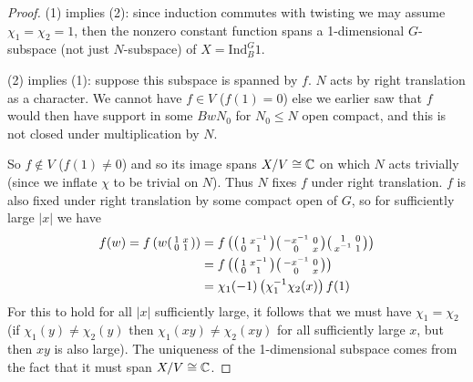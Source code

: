 \begin{proof}
    (1) implies (2): since induction commutes with twisting we may assume $\chi_1=\chi_2=1$, then the nonzero constant function spans a 1-dimensional $G$-subspace (not just $N$-subspace) of $X = \mathrm{Ind}_B^G 1$.

    (2) implies (1): suppose this subspace is spanned by $f$. $N$ acts by right translation as a character. We cannot have $f \in V$ ($f(1)=0$) else we earlier saw that $f$ would then have support in some $BwN_0$ for $N_0 \leq N$ open compact, and this is not closed under multiplication by $N$.

    So $f \not\in V$ ($f(1) \neq 0$) and so its image spans $X/V \cong \mathbb{C}$ on which $N$ acts trivially (since we inflate $\chi$ to be trivial on $N$). Thus $N$ fixes $f$ under right translation. $f$ is also fixed under right translation by some compact open of $G$, so for sufficiently large $|x|$ we have
    \begin{equation*}
        \begin{split}
            f(w) = f\left(w \begin{psmallmatrix}
                1&x \\0 & 1
            \end{psmallmatrix}\right) &= f\left( \begin{psmallmatrix}
                1&x^{-1} \\0 & 1
            \end{psmallmatrix}\begin{psmallmatrix}
                -x^{-1}&0 \\0 & x
            \end{psmallmatrix}\begin{psmallmatrix}
                1&0 \\x^{-1} & 1
            \end{psmallmatrix}\right) \\
            &= f\left( \begin{psmallmatrix}
                1&x^{-1} \\0 & 1
            \end{psmallmatrix}\begin{psmallmatrix}
                -x^{-1}&0 \\0 & x
            \end{psmallmatrix}\right) \\
            &= \chi_1(-1) \left( \chi_1^{-1}\chi_2(x)\right) f(1)
        \end{split}
    \end{equation*}
    For this to hold for all $|x|$ sufficiently large, it follows that we must have $\chi_1=\chi_2$ (if $\chi_1(y) \neq \chi_2(y)$ then $\chi_1(xy) \neq \chi_2(xy)$ for all sufficiently large $x$, but then $xy$ is also large). The uniqueness of the 1-dimensional subspace comes from the fact that it must span $X/V \cong \mathbb{C}$. 
\end{proof}

